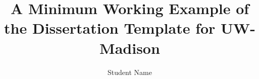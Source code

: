 \documentclass[12pt,oneside,letterpaper]{memoir}
\title{A Minimum Working Example of the Dissertation Template for UW-Madison}
\author{Student Name}
\begin{document}
\maketitle
\makefrontmatter

 

\OnehalfSpacing



\end{document}
